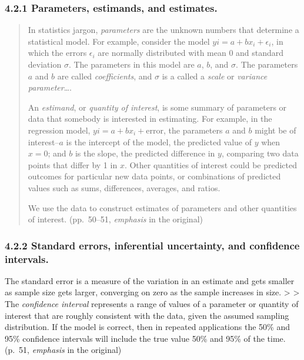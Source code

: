 \documentclass[
]{article}
\begin{document}
\hypertarget{parameters-estimands-and-estimates.}{%
\subsubsection{4.2.1 Parameters, estimands, and
estimates.}\label{parameters-estimands-and-estimates.}}

\begin{quote}
In statistics jargon, \emph{parameters} are the unknown numbers that
determine a statistical model. For example, consider the model
\(yi = a + b x_i + \epsilon_i\), in which the errors \(\epsilon_i\) are
normally distributed with mean 0 and standard deviation \(\sigma\). The
parameters in this model are \(a\), \(b\), and \(\sigma\). The
parameters \(a\) and \(b\) are called \emph{coefficients}, and
\(\sigma\) is a called a \emph{scale} or \emph{variance
parameter}\ldots.

An \emph{estimand}, or \emph{quantity of interest}, is some summary of
parameters or data that somebody is interested in estimating. For
example, in the regression model, \(yi = a + b x_i + \text{error}\), the
parameters \(a\) and \(b\) might be of interest--\(a\) is the intercept
of the model, the predicted value of \(y\) when \(x = 0\); and \(b\) is
the slope, the predicted difference in \(y\), comparing two data points
that differ by 1 in \(x\). Other quantities of interest could be
predicted outcomes for particular new data points, or combinations of
predicted values such as sums, differences, averages, and ratios.

We use the data to construct estimates of parameters and other
quantities of interest. (pp.~50--51, \emph{emphasis} in the original)
\end{quote}

\hypertarget{standard-errors-inferential-uncertainty-and-confidence-intervals.}{%
\subsubsection{4.2.2 Standard errors, inferential uncertainty, and
confidence
intervals.}\label{standard-errors-inferential-uncertainty-and-confidence-intervals.}}

The standard error is a measure of the variation in an estimate and gets
smaller as sample size gets larger, converging on zero as the sample
increases in size. \textgreater{} \textgreater{} The \emph{confidence
interval} represents a range of values of a parameter or quantity of
interest that are roughly consistent with the data, given the assumed
sampling distribution. If the model is correct, then in repeated
applications the 50\% and 95\% confidence intervals will include the
true value 50\% and 95\% of the time. (p.~51, \emph{emphasis} in the
original)
\end{document}
